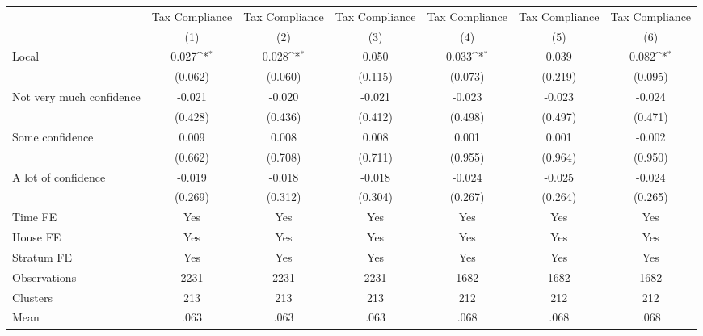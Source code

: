 {
\def\sym#1{\ifmmode^{#1}\else\(^{#1}\)\fi}
\begin{tabular}{l*{6}{c}}
\toprule
                &\multicolumn{1}{c}{Tax Compliance}&\multicolumn{1}{c}{Tax Compliance}&\multicolumn{1}{c}{Tax Compliance}&\multicolumn{1}{c}{Tax Compliance}&\multicolumn{1}{c}{Tax Compliance}&\multicolumn{1}{c}{Tax Compliance}\\
                &\multicolumn{1}{c}{(1)}         &\multicolumn{1}{c}{(2)}         &\multicolumn{1}{c}{(3)}         &\multicolumn{1}{c}{(4)}         &\multicolumn{1}{c}{(5)}         &\multicolumn{1}{c}{(6)}         \\
\midrule
Local           &    0.027\sym{*}  &    0.028\sym{*}  &    0.050         &    0.033\sym{*}  &    0.039         &    0.082\sym{*}  \\
                &  (0.062)         &  (0.060)         &  (0.115)         &  (0.073)         &  (0.219)         &  (0.095)         \\
Not very much confidence&   -0.021         &   -0.020         &   -0.021         &   -0.023         &   -0.023         &   -0.024         \\
                &  (0.428)         &  (0.436)         &  (0.412)         &  (0.498)         &  (0.497)         &  (0.471)         \\
Some confidence &    0.009         &    0.008         &    0.008         &    0.001         &    0.001         &   -0.002         \\
                &  (0.662)         &  (0.708)         &  (0.711)         &  (0.955)         &  (0.964)         &  (0.950)         \\
A lot of confidence&   -0.019         &   -0.018         &   -0.018         &   -0.024         &   -0.025         &   -0.024         \\
                &  (0.269)         &  (0.312)         &  (0.304)         &  (0.267)         &  (0.264)         &  (0.265)         \\
Time FE         &      Yes         &      Yes         &      Yes         &      Yes         &      Yes         &      Yes         \\
House FE        &      Yes         &      Yes         &      Yes         &      Yes         &      Yes         &      Yes         \\
Stratum FE      &      Yes         &      Yes         &      Yes         &      Yes         &      Yes         &      Yes         \\
\midrule
Observations    &     2231         &     2231         &     2231         &     1682         &     1682         &     1682         \\
Clusters        &      213         &      213         &      213         &      212         &      212         &      212         \\
Mean            &     .063         &     .063         &     .063         &     .068         &     .068         &     .068         \\
\bottomrule
\end{tabular}
}
